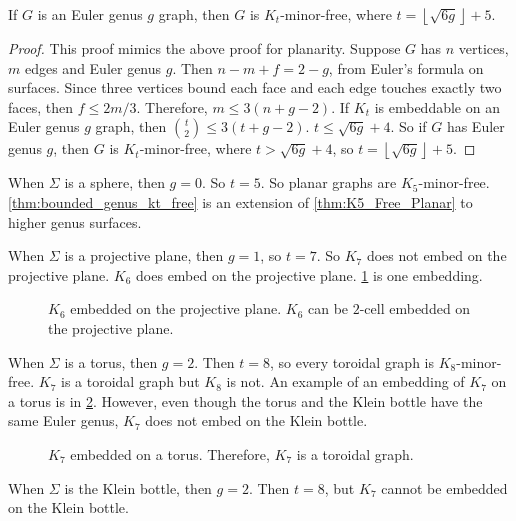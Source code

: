 \begin{theorem}\label{thm:bounded_genus_kt_free}
	If \(G\) is an Euler genus \(g\) graph, then \(G\) is \(K_t\)-minor-free, where \(t = \left\lfloor \sqrt{6g} \right\rfloor + 5\). 
\end{theorem}
\begin{proof}
	This proof mimics the above proof for planarity.
	Suppose \(G\) has \(n\) vertices, \(m\) edges and Euler genus $g$. Then \(n - m + f = 2-g\), from Euler's formula on surfaces. Since three vertices bound each face and each edge touches exactly two faces, then \(f \leq 2m/3\). Therefore, \(m \leq 3(n + g - 2)\). If \(K_t\) is embeddable on an Euler genus \(g\) graph, then \(\binom{t}{2} \leq 3 (t + g - 2)\). \(t \leq \sqrt{6g} + 4\). So if $G$ has Euler genus \(g\), then $G$ is \(K_t\)-minor-free, where \(t > \sqrt{6g} + 4\), so \(t = \left\lfloor \sqrt{6g} \right\rfloor + 5\). 
\end{proof}
When $\Sigma$ is a sphere, then $g = 0$. So $t = 5$. So planar graphs are $K_5$-minor-free. \cref{thm:bounded_genus_kt_free} is an extension of \cref{thm:K5_Free_Planar} to higher genus surfaces. 

When $\Sigma$ is a projective plane, then $g = 1$, so $t = 7$. So $K_7$ does not embed on the projective plane. $K_6$ does embed on the projective plane. \cref{fig:k6_on_proj_plane} is one embedding.

\begin{figure}[h!]
	\centering
	
	\caption[$K_6$ embedded on the projective plane]{$K_6$ embedded on the projective plane. $K_6$ can be $2$-cell embedded on the projective plane.}\label{fig:k6_on_proj_plane}
\end{figure}

When $\Sigma$ is a torus, then $g = 2$. Then $t = 8$, so every toroidal graph is $K_8$-minor-free. $K_7$ is a toroidal graph but $K_8$ is not. An example of an embedding of $K_7$ on a torus is in \cref{fig:k7_on_torus}. However, even though the torus and the Klein bottle have the same Euler genus, $K_7$ does not embed on the Klein bottle. 

\begin{figure}[h!]
	\centering
	
	\caption[$K_7$ embedded on the torus]{$K_7$ embedded on a torus. Therefore, $K_7$ is a toroidal graph.}\label{fig:k7_on_torus}
\end{figure}

When $\Sigma$ is the Klein bottle, then $g = 2$. Then $t = 8$, but $K_7$ cannot be embedded on the Klein bottle.

